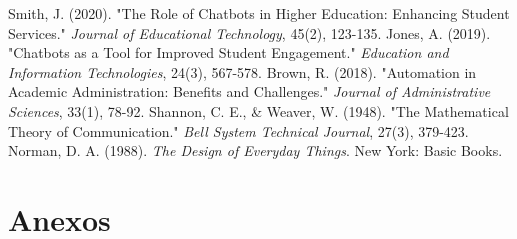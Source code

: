 \documentclass[12pt,a4paper]{article} %
\begin{document}
\begin{thebibliography}{99}
 Smith, J. (2020). "The Role of Chatbots in Higher Education: Enhancing Student Services." \textit{Journal of Educational Technology}, 45(2), 123-135.
 Jones, A. (2019). "Chatbots as a Tool for Improved Student Engagement." \textit{Education and Information Technologies}, 24(3), 567-578.
 Brown, R. (2018). "Automation in Academic Administration: Benefits and Challenges." \textit{Journal of Administrative Sciences}, 33(1), 78-92.
 Shannon, C. E., \& Weaver, W. (1948). "The Mathematical Theory of Communication." \textit{Bell System Technical Journal}, 27(3), 379-423.
 Norman, D. A. (1988). \textit{The Design of Everyday Things}. New York: Basic Books.
\end{thebibliography}

\newpage

\appendix
\section{Anexos}

\end{document}
